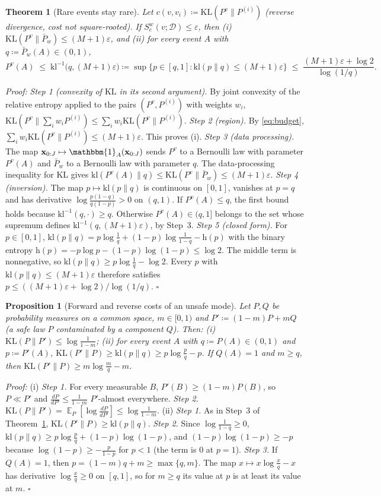 \documentclass{article}
\DeclareMathOperator{\E}{\mathbb{E}}
\newcommand{\cD}{\mathcal{D}}                       %
\newcommand{\Pv}[1]{P^{#1}}                         %
\newcommand{\Pbar}{\bar{P}}                         %
\newcommand{\KL}{\mathrm{KL}}
\newcommand{\kl}{\mathrm{kl}}
\newcommand{\klinv}{\mathrm{kl}^{-1}}
\newcommand{\bx}{\mathbf{x}}
\theoremstyle{plain}
\newtheorem{theorem}{Theorem}
\newtheorem{proposition}{Proposition}
\begin{document}
\begin{theorem}[Rare events stay rare]\label{th:rare}
Let $c(v,v_i)\coloneqq\KL(\Pv{v}\|P^{(i)})$ (reverse divergence, cost not square-rooted). If
$S^w_c(v;\cD)\leq\varepsilon$, then
(i) $\KL(\Pv{v}\|\Pbar_w)\leq(M+1)\varepsilon$, and
(ii) for every event $A$ with $q\coloneqq\Pbar_w(A)\in(0,1)$,
\[
  \Pv{v}(A)\;\leq\;\klinv\big(q,(M+1)\varepsilon\big)\coloneqq\sup\big\{p\in[q,1]:\kl(p\|q)\leq(M+1)\varepsilon\big\}
  \;\leq\;\frac{(M+1)\varepsilon+\log2}{\log(1/q)} .
\]
\end{theorem}
\textit{Proof:}
\emph{Step 1 (convexity of $\KL$ in its second argument).} By joint convexity of the relative
entropy \citep[Thm.~2.7.2]{cover2006elements} applied to the pairs $(\Pv{v},P^{(i)})$ with weights
$w_i$, $\KL(\Pv{v}\|\sum_iw_iP^{(i)})\leq\sum_iw_i\KL(\Pv{v}\|P^{(i)})$.
\emph{Step 2 (region).} By \eqref{eq:budget}, $\sum_iw_i\KL(\Pv{v}\|P^{(i)})\leq(M+1)\varepsilon$. This proves (i).
\emph{Step 3 (data processing).} The map $\bx_{0:J}\mapsto\mathbbm{1}_A(\bx_{0:J})$ sends $\Pv{v}$ to a
Bernoulli law with parameter $\Pv{v}(A)$ and $\Pbar_w$ to a Bernoulli law with parameter $q$.
The data-processing inequality for $\KL$ gives $\kl(\Pv{v}(A)\|q)\leq\KL(\Pv{v}\|\Pbar_w)\leq(M+1)\varepsilon$.
\emph{Step 4 (inversion).} The map $p\mapsto\kl(p\|q)$ is continuous on $[0,1]$, vanishes at $p=q$
and has derivative $\log\frac{p(1-q)}{q(1-p)}>0$ on $(q,1)$. If $\Pv{v}(A)\leq q$, the first bound
holds because $\klinv(q,\cdot)\geq q$. Otherwise $\Pv{v}(A)\in(q,1]$ belongs to the set whose
supremum defines $\klinv(q,(M+1)\varepsilon)$, by Step~3.
\emph{Step 5 (closed form).} For $p\in[0,1]$,
$\kl(p\|q)=p\log\frac1q+(1-p)\log\frac{1}{1-q}-\mathrm{h}(p)$ with the binary entropy
$\mathrm{h}(p)=-p\log p-(1-p)\log(1-p)\leq\log2$. The middle term is nonnegative, so
$\kl(p\|q)\geq p\log\frac1q-\log2$. Every $p$ with $\kl(p\|q)\leq(M+1)\varepsilon$ therefore
satisfies $p\leq((M+1)\varepsilon+\log2)/\log(1/q)$. \hfill $\square$

\begin{proposition}[Forward and reverse costs of an unsafe mode]\label{pr:direction}
Let $P,Q$ be probability measures on a common space, $m\in[0,1)$ and $P'\coloneqq(1-m)P+mQ$
(a safe law $P$ contaminated by a component $Q$). Then:
(i) $\KL(P\|P')\leq\log\frac{1}{1-m}$;
(ii) for every event $A$ with $q\coloneqq P(A)\in(0,1)$ and $p\coloneqq P'(A)$,
$\KL(P'\|P)\geq\kl(p\|q)\geq p\log\frac{p}{q}-p$. If $Q(A)=1$ and $m\geq q$, then
$\KL(P'\|P)\geq m\log\frac{m}{q}-m$.
\end{proposition}
\textit{Proof:}
(i) \emph{Step 1.} For every measurable $B$, $P'(B)\geq(1-m)P(B)$, so $P\ll P'$ and
$\frac{dP}{dP'}\leq\frac{1}{1-m}$ $P'$-almost everywhere. \emph{Step 2.}
$\KL(P\|P')=\E_P[\log\frac{dP}{dP'}]\leq\log\frac{1}{1-m}$.
(ii) \emph{Step 1.} As in Step~3 of Theorem~\ref{th:rare}, $\KL(P'\|P)\geq\kl(p\|q)$.
\emph{Step 2.} Since $\log\frac{1}{1-q}\geq0$,
$\kl(p\|q)\geq p\log\frac pq+(1-p)\log(1-p)$, and $(1-p)\log(1-p)\geq-p$ because
$\log(1-p)\geq-\frac{p}{1-p}$ for $p<1$ (the term is $0$ at $p=1$).
\emph{Step 3.} If $Q(A)=1$, then $p=(1-m)q+m\geq\max\{q,m\}$. The map $x\mapsto x\log\frac xq-x$ has
derivative $\log\frac xq\geq0$ on $[q,1]$, so for $m\geq q$ its value at $p$ is at least its value
at $m$. \hfill $\square$
\end{document}

